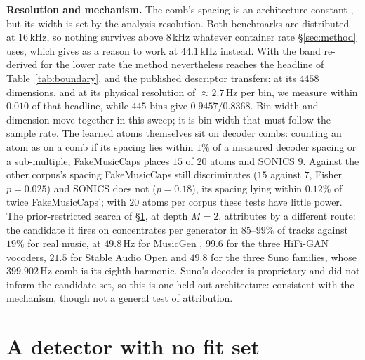 \documentclass{article}
\begin{document}
\noindent\textbf{Resolution and mechanism.}\label{sec:resolution} The comb's spacing
is an architecture constant \cite{pons2021upsampling,odena2016deconvolution}, but its
width is set by the analysis resolution. Both benchmarks are distributed at
$16$\,kHz, so nothing survives above $8$\,kHz whatever container rate
\S\ref{sec:method} uses, which \cite{afchar2026finding} gives as a reason to work at
$44.1$\,kHz instead. With the band re-derived for the lower rate the method
nevertheless reaches the headline of Table~\ref{tab:boundary}, and the published
descriptor transfers: at its $4458$ dimensions, and at its physical resolution of
${\approx}2.7$\,Hz per bin, we measure within $0.010$ of that headline, while $445$
bins give $0.9457$/$0.8368$. Bin width and dimension move together in this sweep; it
is bin width that must follow the sample rate. The learned atoms themselves sit on
decoder combs: counting an atom as on a comb if its spacing lies within $1\%$ of a
measured decoder spacing or a sub-multiple, FakeMusicCaps places $15$ of $20$ atoms
and SONICS $9$. Against the other corpus's spacing FakeMusicCaps still discriminates
($15$ against $7$, Fisher $p = 0.025$) and SONICS does not ($p = 0.18$), its spacing
lying within $0.12\%$ of twice FakeMusicCaps'; with $20$ atoms per corpus these tests
have little power. The prior-restricted search of \S\ref{sec:detector}, at depth
$M{=}2$, attributes by a different route: the candidate it fires on concentrates per
generator in $85$--$99\%$ of tracks against $19\%$ for real music, at $49.8$\,Hz for
MusicGen \cite{copet2023musicgen}, $99.6$ for the three HiFi-GAN
\cite{kong2020hifigan} vocoders, $21.5$ for Stable Audio Open
\cite{evans2024stableaudio} and $49.8$ for the three Suno families, whose
$399.902$\,Hz comb is its eighth harmonic. Suno's decoder is proprietary and did not
inform the candidate set, so this is one held-out architecture: consistent with the
mechanism, though not a general test of attribution.

\section{A detector with no fit set}
\label{sec:detector}
\end{document}
